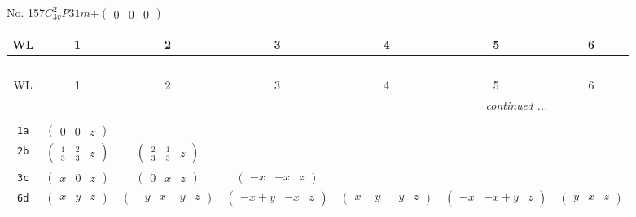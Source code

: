 \documentclass[fleqn,9pt,landscape]{jsarticle}
\begin{document}
\newpage
No. 157\quad$C_{3v}^{2}$\quad$P31m$\quad[ trigonal ]\quad$+\begin{pmatrix} 0 & 0 & 0 \end{pmatrix}$
\begin{center}
\renewcommand{\arraystretch}{1.2}
\begin{longtable}{ccccccc}
 \hline \hline
WL & 1 & 2 & 3 & 4 & 5 & 6 \\ \hline \endfirsthead

\multicolumn{6}{l}{\tablename\ \thetable{}} \\
 \hline \hline
WL & 1 & 2 & 3 & 4 & 5 & 6 \\ \hline \endhead

 \hline \hline
\multicolumn{6}{r}{\footnotesize\it continued ...} \\ \endfoot

 \hline \hline
\multicolumn{6}{r}{} \\ \endlastfoot

{\tt 1a} & $ \begin{pmatrix} 0 & 0 & z \end{pmatrix} $ & $  $ & $  $ & $  $ & $  $ & $  $ \\ \hline
{\tt 2b} & $ \begin{pmatrix} \frac{1}{3} & \frac{2}{3} & z \end{pmatrix} $ & $ \begin{pmatrix} \frac{2}{3} & \frac{1}{3} & z \end{pmatrix} $ & $  $ & $  $ & $  $ & $  $ \\ \hline
{\tt 3c} & $ \begin{pmatrix} x & 0 & z \end{pmatrix} $ & $ \begin{pmatrix} 0 & x & z \end{pmatrix} $ & $ \begin{pmatrix} - x & - x & z \end{pmatrix} $ & $  $ & $  $ & $  $ \\ \hline
{\tt 6d} & $ \begin{pmatrix} x & y & z \end{pmatrix} $ & $ \begin{pmatrix} - y & x - y & z \end{pmatrix} $ & $ \begin{pmatrix} - x + y & - x & z \end{pmatrix} $ & $ \begin{pmatrix} x - y & - y & z \end{pmatrix} $ & $ \begin{pmatrix} - x & - x + y & z \end{pmatrix} $ & $ \begin{pmatrix} y & x & z \end{pmatrix} $ \\
\end{longtable}
\end{center}
\end{document}
